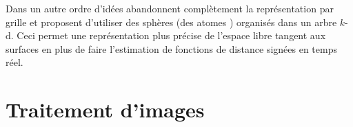 Dans un autre ordre d'idées \cite{Fridovich-Keil2017AtomMap} abandonnent complètement la représentation par grille et proposent d'utiliser des sphères (des \guillemotleft atomes \guillemotright) organisés dans un arbre $k$-d. Ceci permet une représentation plus précise de l'espace libre tangent aux surfaces en plus de faire l'estimation de fonctions de distance signées en temps réel.



\section{Traitement d'images}

